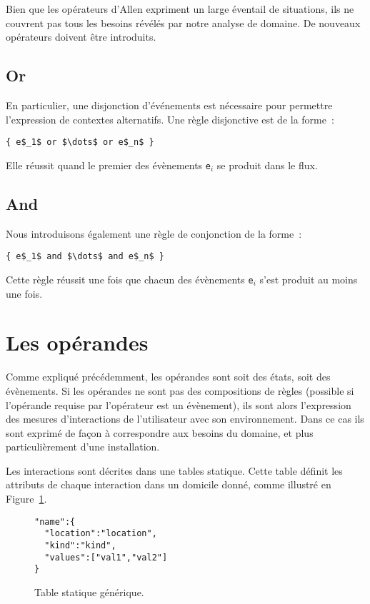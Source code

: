 
Bien que les opérateurs d'Allen expriment un large éventail de
situations, ils ne couvrent pas tous les besoins révélés par notre
analyse de domaine. De nouveaux opérateurs doivent être introduits. 

\subsection{Or}
En
particulier, une disjonction d'événements est nécessaire pour
permettre l'expression de contextes alternatifs. Une règle disjonctive
est de la forme~:
\begin{lstlisting}[language=MaloyaText]
{ e$_1$ or $\dots$ or e$_n$ }
\end{lstlisting}
Elle réussit quand le premier des évènements {\tt e$_i$} se produit dans le flux. 

\subsection{And}
Nous introduisons également une règle de conjonction de la forme~: 
\begin{lstlisting}[language=MaloyaText]
{ e$_1$ and $\dots$ and e$_n$ }
\end{lstlisting}
Cette règle réussit une fois que chacun des évènements {\tt e$_i$} s'est produit au moins une fois.

\section{Les opérandes}
Comme expliqué précédemment, les opérandes sont soit des états, soit des évènements. Si les opérandes ne sont pas des compositions de règles (possible si l'opérande requise par l'opérateur est un évènement), ils sont alors l'expression des mesures d'interactions de l'utilisateur avec son environnement. Dans ce cas ils sont exprimé de façon à correspondre aux besoins du domaine, et plus particulièrement d'une installation.

Les interactions sont décrites dans une tables statique. Cette table définit les attributs de chaque interaction dans un domicile donné, comme illustré en Figure~\ref{listing:table_static_generique}.

\begin{figure}
\begin{lstlisting}[frame=bt]
"name":{
  "location":"location",
  "kind":"kind",
  "values":["val1","val2"]
}
\end{lstlisting}
\caption{Table statique générique.}
\label{listing:table_static_generique}
\end{figure}

